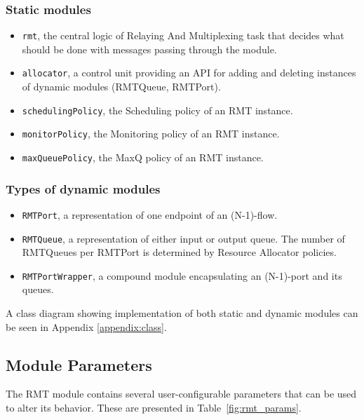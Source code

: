             \subsubsection{Static modules}
            \begin{itemize}
                \item \texttt{rmt}, the central logic of Relaying And Multiplexing task that decides what should be done with messages passing through the module.
                \item \texttt{allocator}, a control unit providing an API for adding and deleting instances of dynamic modules (RMTQueue, RMTPort).
                \item \texttt{schedulingPolicy}, the Scheduling policy of an RMT instance.
                \item \texttt{monitorPolicy}, the Monitoring policy of an RMT instance.
                \item \texttt{maxQueuePolicy}, the MaxQ policy of an RMT instance.
            \end{itemize}

            \subsubsection{Types of dynamic modules}
            \begin{itemize}
                \item \texttt{RMTPort}, a representation of one endpoint of an (N-1)-flow.
                \item \texttt{RMTQueue}, a representation of either input or output queue. The number of RMTQueues per RMTPort is determined by Resource Allocator policies.
                \item \texttt{RMTPortWrapper}, a compound module encapsulating an (N-1)-port and its queues.
            \end{itemize}

            A class diagram showing implementation of both static and dynamic modules can be seen in Appendix \ref{appendix:class}.

        \subsection{Module Parameters}
            The RMT module contains several user-configurable parameters that can be used to alter its behavior. These are presented in Table~\ref{fig:rmt_params}.

